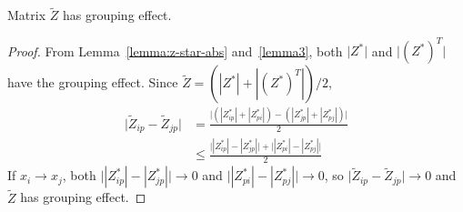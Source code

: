 \begin{lemma}
\label{lemma4}
Matrix $\tilde{Z}$ has grouping effect. 
\begin{proof}
From Lemma~\ref{lemma:z-star-abs} and~\ref{lemma3},
both $\lvert Z^*\rvert$ and $\lvert (Z^*)^T\rvert$ have the grouping effect.
Since $\tilde{Z} = (|Z^*|+|(Z^*)^T|)/2$,
\begin{equation}
\begin{split}
\lvert \tilde{Z}_{ip} - \tilde{Z}_{jp}\rvert & = \frac{\bigl| (|Z^*_{ip}|+|Z^*_{pi}|) - (|Z^*_{jp}|+|Z^*_{pj}|)\bigr|}{2} \\
& \leq \frac{\bigl||Z_{ip}^*|-|Z_{jp}^*|\bigr| + \bigl||Z_{pi}^*|-|Z_{pj}^*|\bigr|}{2}
\end{split}
\end{equation}
If $x_i \rightarrow x_j$,
both $\bigl||Z_{ip}^*|-|Z_{jp}^*|\bigr| \rightarrow 0$ and $\bigl||Z_{pi}^*|-|Z_{pj}^*|\bigr| \rightarrow 0$,
so $\lvert \tilde{Z}_{ip} - \tilde{Z}_{jp}\rvert \rightarrow 0$ and
$\tilde{Z}$ has grouping effect.
\end{proof}
\end{lemma}


